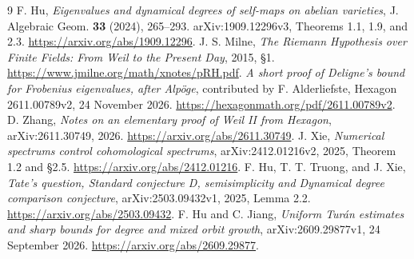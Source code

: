 \documentclass[11pt]{article}
\begin{document}
\begin{thebibliography}{9}\small
{}
F. Hu, \emph{Eigenvalues and dynamical degrees of self-maps on abelian
varieties}, J. Algebraic Geom. \textbf{33} (2024), 265--293.
arXiv:1909.12296v3, Theorems 1.1, 1.9, and 2.3.
\url{https://arxiv.org/abs/1909.12296}.
J. S. Milne, \emph{The Riemann Hypothesis over Finite Fields:
From Weil to the Present Day}, 2015, \S1.
\url{https://www.jmilne.org/math/xnotes/pRH.pdf}.
\emph{A short proof of Deligne's bound for Frobenius eigenvalues,
after Alp\"oge}, contributed by F. Alderliefste,
Hexagon 2611.00789v2, 24 November 2026.
\url{https://hexagonmath.org/pdf/2611.00789v2}.
D. Zhang, \emph{Notes on an elementary proof of Weil II from Hexagon},
arXiv:2611.30749, 2026.
\url{https://arxiv.org/abs/2611.30749}.
J. Xie, \emph{Numerical spectrums control cohomological spectrums},
arXiv:2412.01216v2, 2025, Theorem 1.2 and \S2.5.
\url{https://arxiv.org/abs/2412.01216}.
F. Hu, T. T. Truong, and J. Xie, \emph{Tate's question, Standard conjecture D,
semisimplicity and Dynamical degree comparison conjecture},
arXiv:2503.09432v1, 2025, Lemma 2.2.
\url{https://arxiv.org/abs/2503.09432}.
F. Hu and C. Jiang, \emph{Uniform Tur\'an estimates and sharp bounds for
degree and mixed orbit growth}, arXiv:2609.29877v1,
24 September 2026.
\url{https://arxiv.org/abs/2609.29877}.
\end{thebibliography}
\end{document}
